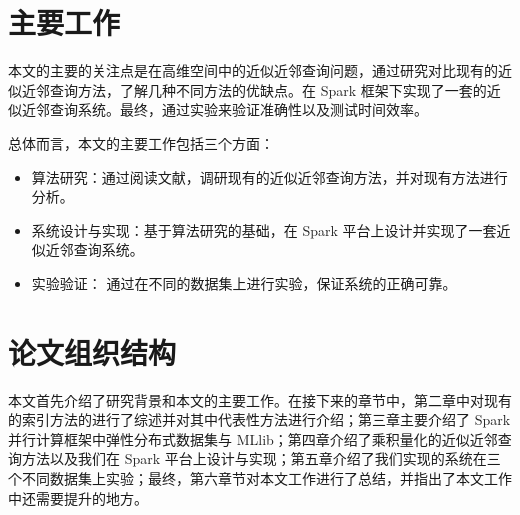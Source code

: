\section{主要工作}
本文的主要的关注点是在高维空间中的近似近邻查询问题，通过研究对比现有的近似近邻查询方法，了解几种不同方法的优缺点。在 Spark 框架下实现了一套的近似近邻查询系统。最终，通过实验来验证准确性以及测试时间效率。

总体而言，本文的主要工作包括三个方面：
\begin{itemize}
\item 算法研究：通过阅读文献，调研现有的近似近邻查询方法，并对现有方法进行分析。
\item 系统设计与实现：基于算法研究的基础，在 Spark 平台上设计并实现了一套近似近邻查询系统。
\item 实验验证： 通过在不同的数据集上进行实验，保证系统的正确可靠。
\end{itemize}

\section{论文组织结构}
本文首先介绍了研究背景和本文的主要工作。在接下来的章节中，第二章中对现有的索引方法的进行了综述并对其中代表性方法进行介绍；第三章主要介绍了 Spark 并行计算框架中弹性分布式数据集与 MLlib；第四章介绍了乘积量化的近似近邻查询方法以及我们在 Spark 平台上设计与实现；第五章介绍了我们实现的系统在三个不同数据集上实验；最终，第六章节对本文工作进行了总结，并指出了本文工作中还需要提升的地方。
